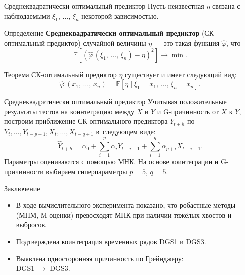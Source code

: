 \documentclass{beamer}
\begin{document}
	\begin{frame}{Среднеквадратически оптимальный предиктор}
		Пусть неизвестная $\eta$ связана с наблюдаемыми $\xi_1,\,\ldots,\,\xi_n$ некоторой зависимостью.
		\begin{block}{Определение}
			\textbf{Среднеквадратически оптимальный предиктор} (СК-оптимальный предиктор) случайной величины $\eta$ --- это такая функция $\widehat{\varphi}$, что
			\begin{equation*}
				\mathbb{E} \left[ ( \widehat{\varphi} \, (\xi_1,\,\ldots,\,\xi_n) - \eta )^2 \right] \rightarrow \min\!.
			\end{equation*}
		\end{block}
		\begin{block}{Теорема}
			СК-оптимальный предиктор $\eta$ существует и имеет следующий вид:
			\begin{equation*}
				\widehat{\varphi} \, (x_1,\,\ldots,\,x_n) = \mathbb{E} \left[ \eta \mid \xi_1=x_1,\,\ldots,\,\xi_n=x_n \right]\!.
			\end{equation*}
		\end{block}
	\end{frame}
	
	\begin{frame}{Среднеквадратически оптимальный предиктор}
		Учитывая положительные результаты тестов на коинтеграцию между $X$ и $Y$ и G-причинность от $X$ к $Y$, построим приближение СК-оптимального предиктора $Y_{t+h}$ по $Y_t,\dots,Y_{t-p+1}, X_t,\dots,X_{t-q+1}$ в~следующем виде:
		\begin{equation*}
			\widehat{Y}_{t+h} = \alpha_0 + \sum_{i=1}^p \alpha_i Y_{t-i+1} + \sum_{i=1}^q \alpha_{p+i} X_{t-i+1}.
		\end{equation*}
		Параметры оцениваются с помощью МНК. %
		На основе коинтеграции и G-причинности выбираем гиперпараметры $p=5$, $q=5$.%
	\end{frame}
	
	\begin{frame}{Заключение}
		\begin{itemize}
			\item В ходе вычислительного эксперимента показано, что робастные методы (МНМ, M-оценки) превосходят МНК при наличии тяжёлых хвостов и выбросов.
			\item Подтверждена коинтеграция временных рядов DGS1 и DGS3.
			\item Выявлена односторонняя причинность по Грейнджеру:\\DGS1 $\to$ DGS3.
		\end{itemize}
	\end{frame}
	
\end{document}
